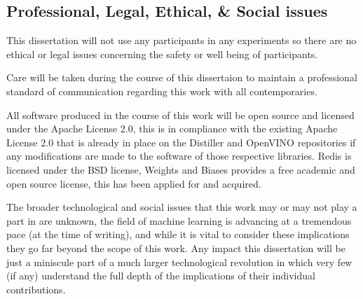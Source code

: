 \documentclass[../D1.tex]{subfiles}
\begin{document}
\subsection{Professional, Legal, Ethical, \& Social issues}
This dissertation will not use any participants in any experiments so there are no ethical or legal issues concerning the safety or well being of participants.


Care will be taken during the course of this dissertaion to maintain a professional standard of communication regarding this work with all contemporaries. 


All software produced in the course of this work will be open source and licensed under the Apache License 2.0, this is in  compliance with the existing Apache License 2.0 that is already in place on the Distiller and OpenVINO repositories if any modifications are made to the software of those respective libraries.
Redis is licensed under the BSD license, Weights and Biases provides a free academic and open source license, this has been applied for and acquired.


The broader technological and social issues that this work may or may not play a part in are unknown, the field of machine learning is advancing at a tremendous pace (at the time of writing), and while it is vital to consider these implications they go far beyond the scope of this work. 
Any impact this dissertation will be just a miniscule part of a much larger technological revolution in which very few (if any) understand the full depth of the implications of their individual contributions.
\end{document}
